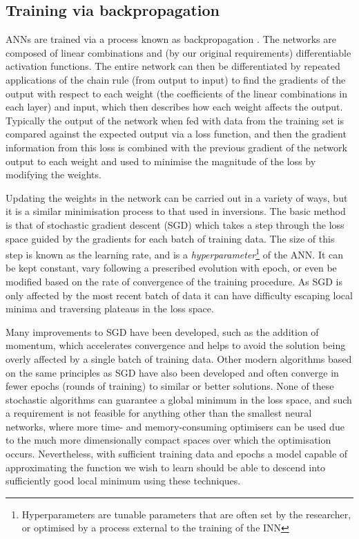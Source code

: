 \subsection{Training via backpropagation}

ANNs are trained via a process known as backpropagation \citep{Rumelhart1986}.
The networks are composed of linear combinations and (by our original requirements) differentiable activation functions.
The entire network can then be differentiated by repeated applications of the chain rule (from output to input) to find the gradients of the output with respect to each weight (the coefficients of the linear combinations in each layer) and input, which then describes how each weight affects the output.
Typically the output of the network when fed with data from the training set is compared against the expected output via a loss function, and then the gradient information from this loss is combined with the previous gradient of the network output to each weight and used to minimise the magnitude of the loss by modifying the weights.

Updating the weights in the network can be carried out in a variety of ways, but it is a similar minimisation process to that used in inversions.
The basic method is that of stochastic gradient descent (SGD) which takes a step through the loss space guided by the gradients for each batch of training data.
The size of this step is known as the learning rate, and is a \emph{hyperparameter}\footnote{Hyperparameters are tunable parameters that are often set by the researcher, or optimised by a process external to the training of the INN} of the ANN.
It can be kept constant, vary following a prescribed evolution with epoch, or even be modified based on the rate of convergence of the training procedure.
As SGD is only affected by the most recent batch of data it can have difficulty escaping local minima and traversing plateaus in the loss space.

Many improvements to SGD have been developed, such as the addition of momentum, which accelerates convergence and helps to avoid the solution being overly affected by a single batch of training data.
Other modern algorithms based on the same principles as SGD have also been developed \citep[e.g. the Adam algorithm,][]{2014Kingma} and often converge in fewer epochs (rounds of training) to similar or better solutions.
None of these stochastic algorithms can guarantee a global minimum in the loss space, and such a requirement is not feasible for anything other than the smallest neural networks, where more time- and memory-consuming optimisers can be used due to the much more dimensionally compact spaces over which the optimisation occurs.
Nevertheless, with sufficient training data and epochs a model capable of approximating the function we wish to learn should be able to descend into sufficiently good local minimum using these techniques.

